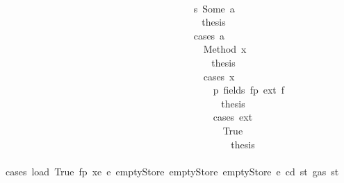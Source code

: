 \begin{isabellebody}
\isanewline
\ \ \ \ \ \ \ \ \ \ \ \ \ \ \ \ \ \ \ \ \ \ \ \ \ \ \ \ \ \ \ \ \ \ \ \ \isamarkupfalse%
\isanewline
\ \ \ \ \ \ \ \ \ \ \ \ \ \ \ \ \ \ \ \ \ \ \ \ \ \ \ \ \ \ \ \ \ \ \ \ \ \ \isamarkupfalse%
\ s{}{\isacharcolon}{\kern0pt}\ {\isacharparenleft}{\kern0pt}Some\ a{\isacharparenright}{\kern0pt}\isanewline
\ \ \ \ \ \ \ \ \ \ \ \ \ \ \ \ \ \ \ \ \ \ \ \ \ \ \ \ \ \ \ \ \ \ \ \ \ \ \isamarkupfalse%
\ \isamarkupfalse%
\ {\isacharquery}{\kern0pt}thesis\isanewline
\ \ \ \ \ \ \ \ \ \ \ \ \ \ \ \ \ \ \ \ \ \ \ \ \ \ \ \ \ \ \ \ \ \ \ \ \ \ \isamarkupfalse%
\ {\isacharparenleft}{\kern0pt}cases\ a{\isacharparenright}{\kern0pt}\isanewline
\ \ \ \ \ \ \ \ \ \ \ \ \ \ \ \ \ \ \ \ \ \ \ \ \ \ \ \ \ \ \ \ \ \ \ \ \ \ \ \ \isamarkupfalse%
\ {\isacharparenleft}{\kern0pt}Method\ x{}{\isacharparenright}{\kern0pt}\isanewline
\ \ \ \ \ \ \ \ \ \ \ \ \ \ \ \ \ \ \ \ \ \ \ \ \ \ \ \ \ \ \ \ \ \ \ \ \ \ \ \ \isamarkupfalse%
\ \isamarkupfalse%
\ {\isacharquery}{\kern0pt}thesis\isanewline
\ \ \ \ \ \ \ \ \ \ \ \ \ \ \ \ \ \ \ \ \ \ \ \ \ \ \ \ \ \ \ \ \ \ \ \ \ \ \ \ \isamarkupfalse%
\ {\isacharparenleft}{\kern0pt}cases\ x{}{\isacharparenright}{\kern0pt}\isanewline
\ \ \ \ \ \ \ \ \ \ \ \ \ \ \ \ \ \ \ \ \ \ \ \ \ \ \ \ \ \ \ \ \ \ \ \ \ \ \ \ \ \ \isamarkupfalse%
\ p{}{\isacharcolon}{\kern0pt}\ {\isacharparenleft}{\kern0pt}fields\ fp\ ext\ f{\isacharparenright}{\kern0pt}\isanewline
\ \ \ \ \ \ \ \ \ \ \ \ \ \ \ \ \ \ \ \ \ \ \ \ \ \ \ \ \ \ \ \ \ \ \ \ \ \ \ \ \ \ \isamarkupfalse%
\ \isamarkupfalse%
\ {\isacharquery}{\kern0pt}thesis\isanewline
\ \ \ \ \ \ \ \ \ \ \ \ \ \ \ \ \ \ \ \ \ \ \ \ \ \ \ \ \ \ \ \ \ \ \ \ \ \ \ \ \ \ \isamarkupfalse%
\ {\isacharparenleft}{\kern0pt}cases\ ext{\isacharparenright}{\kern0pt}\isanewline
\ \ \ \ \ \ \ \ \ \ \ \ \ \ \ \ \ \ \ \ \ \ \ \ \ \ \ \ \ \ \ \ \ \ \ \ \ \ \ \ \ \ \ \ \isamarkupfalse%
\ True\isanewline
\ \ \ \ \ \ \ \ \ \ \ \ \ \ \ \ \ \ \ \ \ \ \ \ \ \ \ \ \ \ \ \ \ \ \ \ \ \ \ \ \ \ \ \ \isamarkupfalse%
\ \isamarkupfalse%
\ {\isacharquery}{\kern0pt}thesis\isanewline
\ \ \ \ \ \ \ \ \ \ \ \ \ \ \ \ \ \ \ \ \ \ \ \ \ \ \ \ \ \ \ \ \ \ \ \ \ \ \ \ \ \ \ \ \isamarkupfalse%
\ {\isacharparenleft}{\kern0pt}cases\ {\isachardoublequoteopen}load\ True\ fp\ xe\ e{\isacharprime}{\kern0pt}\ emptyStore\ emptyStore\ emptyStore\ e\ cd\ st{\isacharprime}{\kern0pt}{\isacharprime}{\kern0pt}{\isacharprime}{\kern0pt}\ {\isacharparenleft}{\kern0pt}gas\ st{\isacharprime}{\kern0pt}{\isacharprime}{\kern0pt}{\isacharprime}{\kern0pt}{\isacharparenright}{\kern0pt}{\isachardoublequoteclose}{\isacharparenright}{\kern0pt}\isanewline

\end{isabellebody}
